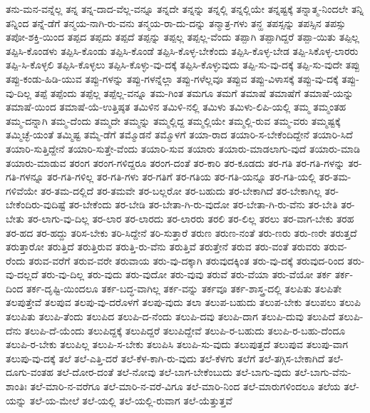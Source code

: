 {ತನು-ಮನ-ವನ್ನೆಲ್ಲ
ತನ್ನ
ತನ್ನ-ದಾದ-ವೆಲ್ಲ-ವನ್ನೂ
ತನ್ನದೇ
ತನ್ನನ್ನು
ತನ್ನಲ್ಲಿ
ತನ್ನಲ್ಲಿಯೇ
ತನ್ನಷ್ಟಕ್ಕೆ
ತನ್ನಾತ್ಮ-ನಿಂದಲೇ
ತನ್ನಿ
ತನ್ನಿಂದ
ತನ್ನೆ-ಡೆಗೆ
ತನ್ಮಯ-ನಾಗಿ-ರು-ವನು
ತನ್ಮಯ-ರಾ-ದು-ದನ್ನು
ತನ್ಮಾತ್ರ-ಗಳು
ತನ್ಹ
ತಪಸ್ಸನ್ನು
ತಪಸ್ಸಿನ
ತಪಸ್ಸು
ತಪೋ-ಶಕ್ತಿ-ಯಿಂದ
ತಪ್ಪದ
ತಪ್ಪದು
ತಪ್ಪದೆ
ತಪ್ಪನ್ನು
ತಪ್ಪಲ್ಲ
ತಪ್ಪಲ್ಲ-ವೆಂದು
ತಪ್ಪಾಗಿ
ತಪ್ಪಾಗಿದ್ದರೆ
ತಪ್ಪಾ-ಯಿತು
ತಪ್ಪಿಲ್ಲ
ತಪ್ಪಿಸಿ-ಕೊಂಡಳು
ತಪ್ಪಿಸಿ-ಕೊಂಡು
ತಪ್ಪಿಸಿ-ಕೊಂಡೆ
ತಪ್ಪಿಸಿ-ಕೊಳ್ಳ-ಬೇಕೆಂದು
ತಪ್ಪಿಸಿ-ಕೊಳ್ಳ-ಬೇಡ
ತಪ್ಪಿ-ಸಿಕೊಳ್ಳ-ಲಾರರು
ತಪ್ಪಿ-ಸಿ-ಕೊಳ್ಳಲಿ
ತಪ್ಪಿಸಿ-ಕೊಳ್ಳಲು
ತಪ್ಪಿಸಿ-ಕೊಳ್ಳು-ವು-ದಕ್ಕೆ
ತಪ್ಪಿಸಿ-ಕೊಳ್ಳುವುದು
ತಪ್ಪಿ-ಸು-ವು-ದಕ್ಕೆ
ತಪ್ಪಿ-ಸು-ವುದೇ
ತಪ್ಪು
ತಪ್ಪು-ಕಂಡು-ಹಿಡಿ-ಯುವ
ತಪ್ಪು-ಗಳನ್ನು
ತಪ್ಪು-ಗಳನ್ನೆಲ್ಲಾ
ತಪ್ಪು-ಗಳೆಲ್ಲವೂ
ತಪ್ಪುವ
ತಪ್ಪು-ವಿಳಾಸಕ್ಕೆ
ತಪ್ಪು-ವು-ದಕ್ಕೆ
ತಪ್ಪು-ವು-ದಿಲ್ಲ
ತಪ್ಪೆ
ತಪ್ಪೆಂದು
ತಪ್ಪೆಲ್ಲ
ತಪ್ಪೆಲ್ಲ-ವನ್ನೂ
ತಮ-ಗಿಂತ
ತಮಗೂ
ತಮಗೆ
ತಮಾಷೆ
ತಮಾಷೆಗೆ
ತಮಾಷೆ-ಯನ್ನು
ತಮಾಷೆ-ಯಿಂದ
ತಮಾಷೆ-ಯೆ-ಉತ್ತಿಷ್ಠತ
ತಮಿಳಿನ
ತಮಿಳಿ-ನಲ್ಲಿ
ತಮಿಳು
ತಮಿಳು-ಲಿಪಿ-ಯಲ್ಲಿ
ತಮ್ಮ
ತಮ್ಮಂತಹ
ತಮ್ಮ-ದನ್ನಾಗಿ
ತಮ್ಮ-ದೆಂದು
ತಮ್ಮದೇ
ತಮ್ಮನ್ನು
ತಮ್ಮಲ್ಲಿದ್ದ
ತಮ್ಮಲ್ಲಿಯೇ
ತಮ್ಮಲ್ಲಿ-ರುವ
ತಮ್ಮ-ವರು
ತಮ್ಮಷ್ಟಕ್ಕೆ
ತಮ್ಮಿಚ್ಛೆ-ಯಂತೆ
ತಮ್ಮಿಷ್ಟ
ತಮ್ಮೆ-ಡೆಗೆ
ತಮ್ಮೊಡನೆ
ತಮ್ಮೊಳಗೆ
ತಯಾ-ರಾದ
ತಯಾರಿ-ಸ-ಬೇಕೆಂದಿದ್ದೇನೆ
ತಯಾರಿ-ಸಿದೆ
ತಯಾರಿ-ಸುತ್ತಿದ್ದೇನೆ
ತಯಾರಿ-ಸುತ್ತೇ-ವೆಂದು
ತಯಾರಿ-ಸುವ
ತಯಾರು
ತಯಾರು-ಮಾಡಲಾಗು-ವುದೆ
ತಯಾರು-ಮಾಡಿ
ತಯಾರು-ಮಾಡುವ
ತರಂಗ
ತರಂಗ-ಗಳಿದ್ದರೂ
ತರಂಗ-ದಂತೆ
ತರ-ಕಾರಿ
ತರ-ಕೂಡದು
ತರ-ಗತಿ
ತರ-ಗತಿ-ಗಳನ್ನು
ತರ-ಗತಿ-ಗಳನ್ನೂ
ತರ-ಗತಿ-ಗಳಿಲ್ಲ
ತರ-ಗತಿ-ಗಳು
ತರ-ಗತಿಗೆ
ತರ-ಗತಿಯ
ತರ-ಗತಿ-ಯನ್ನೂ
ತರ-ಗತಿ-ಯಲ್ಲಿ
ತರ-ತಮ-ಗಳಿವೆಯೇ
ತರ-ತಮ-ದಲ್ಲಿದೆ
ತರ-ತಮವೇ
ತರ-ಬಲ್ಲರೋ
ತರ-ಬಹುದು
ತರ-ಬೇಕಾಗಿದೆ
ತರ-ಬೇಕಾಗಿಲ್ಲ
ತರ-ಬೇಕೆಂದಿರು-ವುದಿಷ್ಟೆ
ತರ-ಬೇಕೆಂದು
ತರ-ಬೇಡಿ
ತರ-ಬೇತಾ-ಗಿ-ರು-ವುದೋ
ತರ-ಬೇತಾ-ಗಿ-ರು-ವೆನು
ತರ-ಬೇತಿ
ತರ-ಬೇತು
ತರ-ಲಾಗು-ವು-ದಿಲ್ಲ
ತರ-ಲಾರ
ತರ-ಲಾರದು
ತರ-ಲಾರರು
ತರಲಿ
ತರ-ಲಿಲ್ಲ
ತರಲು
ತರ-ವಾಗ-ಬೇಕು
ತರಹ
ತರ-ಹದ
ತರ-ಹದ್ದು
ತರಿಸ-ಬೇಕು
ತರಿ-ಸಿದ್ದೇನೆ
ತರಿ-ಸುತ್ತಾರೆ
ತರುಣ
ತರುಣ-ನಂತೆ
ತರು-ಣರು
ತರು-ಣರೇ
ತರುತ್ತದೆ
ತರುತ್ತಾರೋ
ತರುತ್ತಿದೆ
ತರುತ್ತಿರುವ
ತರುತ್ತಿ-ರು-ವೆನು
ತರುತ್ತಿವೆ
ತರುತ್ತೇನೆ
ತರುವ
ತರು-ವಂತೆ
ತರುವರು
ತರುವ-ರೆಂದು
ತರುವ-ವರೆಗೆ
ತರುವ-ವರೇ
ತರುವಾಯ
ತರು-ವು-ದಕ್ಕಾಗಿ
ತರುವುದಕ್ಕಿಂತ
ತರು-ವು-ದಕ್ಕೆ
ತರುವುದ-ರಿಂದ
ತರು-ವು-ದಲ್ಲದೆ
ತರು-ವು-ದಿಲ್ಲ
ತರು-ವುದು
ತರು-ವುದೋ
ತರು-ವುವು
ತರುವೆ
ತರು-ವೆಯಾ
ತರು-ವೆಯೋ
ತರ್ಕ
ತರ್ಕ-ದಿಂದ
ತರ್ಕ-ದೃಷ್ಟಿ-ಯಿಂದಲೂ
ತರ್ಕ-ಬದ್ಧ-ವಾಗಿಲ್ಲ
ತರ್ಕ-ವನ್ನು
ತರ್ಕವೂ
ತರ್ಕ-ಶಾಸ್ತ್ರ-ದಲ್ಲಿ
ತಲಪಿತು
ತಲಪಿತೇ
ತಲಪುತ್ತೇವೆ
ತಲಪುವ
ತಲಪು-ವು-ದರೊಳಗೆ
ತಲಪು-ವುದು
ತಲಾ
ತಲುಪ-ಬಹುದು
ತಲುಪ-ಬೇಕು
ತಲುಪಲು
ತಲುಪಿ
ತಲುಪಿತು
ತಲುಪಿ-ತೆಂದು
ತಲುಪಿದ
ತಲುಪಿ-ದ-ನೆಂದು
ತಲುಪಿ-ದವು
ತಲುಪಿ-ದಾಗ
ತಲುಪಿ-ದುವು
ತಲುಪಿದೆ
ತಲುಪಿ-ದೆನು
ತಲುಪಿ-ದೆ-ಯೆಂದು
ತಲುಪಿದ್ದಕ್ಕೆ
ತಲುಪಿದ್ದರೆ
ತಲುಪಿದ್ದೇವೆ
ತಲುಪಿ-ರ-ಬಹುದು
ತಲುಪಿ-ರ-ಬಹು-ದೆಂದೂ
ತಲುಪಿ-ರ-ಬೇಕು
ತಲುಪಿಲ್ಲ
ತಲುಪಿ-ಸ-ಬೇಕು
ತಲುಪಿಸಿ
ತಲುಪಿ-ಸು-ವುದು
ತಲುಪುತ್ತದೆ
ತಲುಪುವ
ತಲುಪು-ವಾಗ
ತಲುಪು-ವು-ದಕ್ಕೆ
ತಲೆ
ತಲೆ-ಎತ್ತಿ-ದರೆ
ತಲೆ-ಕೆಳ-ಕಾಗಿ-ರು-ವುದು
ತಲೆ-ಕೆಳಗು
ತಲೆಗೆ
ತಲೆ-ತಗ್ಗಿಸ-ಬೇಕಾಗಿದೆ
ತಲೆ-ದೂಗು-ವಂತಹ
ತಲೆ-ದೋರ-ದಂತೆ
ತಲೆ-ನೋವು
ತಲೆ-ಬಾಗ-ಬೇಕೆಂಬುದು
ತಲೆ-ಬಾಗು-ವುದು
ತಲೆ-ಬಾಗು-ವೆನು-ಶಾಂತಿಃ
ತಲೆ-ಮಾರಿ-ನ-ವರೆಗೂ
ತಲೆ-ಮಾರಿ-ನ-ವರೆ-ವಿಗೂ
ತಲೆ-ಮಾರಿ-ನಿಂದ
ತಲೆ-ಮಾರುಗಳಿಂದಲೂ
ತಲೆಯ
ತಲೆ-ಯನ್ನು
ತಲೆ-ಯ-ಮೇಲೆ
ತಲೆ-ಯಲ್ಲಿ
ತಲೆ-ಯಲ್ಲಿ-ರುವಾಗ
ತಲೆ-ಯೆತ್ತುತ್ತವೆ
}
